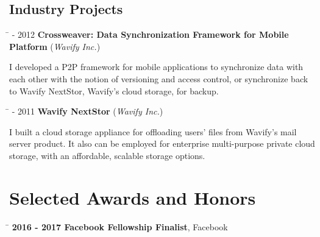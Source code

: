 \documentclass[10pt]{article} %
\begin{document}
\subsection{Industry Projects}

\begin{tabbing}
\hspace{2.5cm} \=  - 2012 \>\+ \textbf{Crossweaver: Data Synchronization Framework for Mobile Platform} (\textit{Wavify Inc.}) \\
\begin{minipage}{\smallertextwidth}
I developed a P2P framework for mobile applications to synchronize data with
each other with the notion of versioning and access control, or synchronize
back to Wavify NextStor, Wavify's cloud storage, for backup.
\end{minipage}
\end{tabbing}

\begin{tabbing}
\hspace{2.5cm} \=  - 2011 \>\+ \textbf{Wavify NextStor} (\textit{Wavify Inc.}) \\
\begin{minipage}{\smallertextwidth}
I built a cloud storage appliance for offloading users' files from Wavify's
mail server product. It also can be employed for enterprise multi-purpose
private cloud storage, with an affordable, scalable storage options.
\end{minipage}
\end{tabbing}


\section{Selected Awards and Honors}

\begin{tabbing}
\hspace{2.5cm} \=  \> \textbf{2016 - 2017 Facebook Fellowship Finalist}, Facebook
\end{tabbing}

\end{document}
